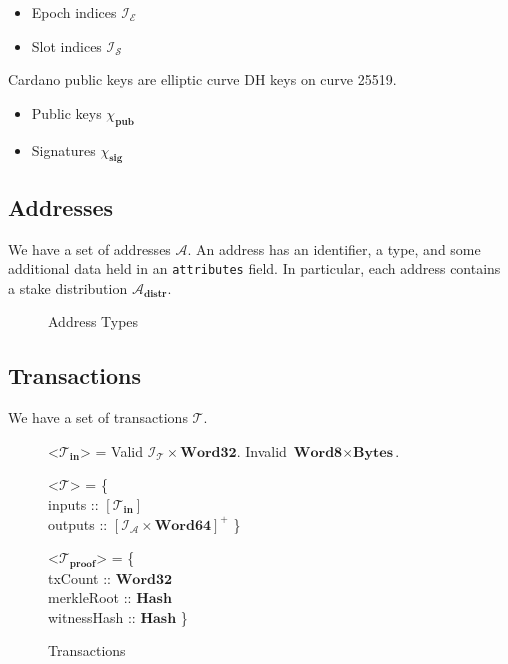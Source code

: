 \documentclass{article}
\def\fld{\\\llap{,\quad}}%
\newcommand{\rhu}{\rightharpoonup}
\newcommand{\lists}[1]{\left[{#1}\right]}
\newcommand{\nelists}[1]{\left[{#1}\right]^+}
\newcommand{\maybe}[1]{$()$ | {#1}}
\newcommand{\idsof}[1]{\mathcal{I}\!_#1}
\newcommand{\txids}{\idsof{\txs}}
\newcommand{\agentids}{\idsof{\agents}}
\newcommand{\epochids}{\idsof{\mathcal{E}}}
\newcommand{\slotids}{\idsof{\mathcal{S}}}
\newcommand{\pubkey}{\chi_{\textbf{pub}}}
\newcommand{\signature}{\chi_{\textbf{sig}}}
\newcommand{\agents}{\mathcal{A}}
\newcommand{\txs}{\mathcal{T}}
\newcommand{\txins}{\txs_{\textbf{in}}}
\newcommand{\txpf}{\txs_{\textbf{proof}}}
\newcommand{\hstype}[1]{\textbf{#1}}
\newcommand{\Word}[1]{\hstype{Word#1}}
\newcommand{\hash}{\hstype{Hash}}
\newcommand{\Bytes}{\hstype{Bytes}}
\begin{document}
\begin{itemize}
\item Epoch indices $\epochids$
\item Slot indices $\slotids$
\end{itemize}

Cardano public keys are elliptic curve DH keys on curve 25519.

\begin{itemize}
\item Public keys $\pubkey$
\item Signatures $\signature$
\end{itemize}

\subsection{Addresses}

We have a set of addresses $\agents$. An address has an identifier, a type, and
some additional data held in an \verb|attributes| field. In particular, each
address contains a stake distribution $\agents_{\textbf{distr}}$.

\begin{figure}[H]

  \caption{Address Types}
\end{figure}

\subsection{Transactions}

We have a set of transactions $\txs$.

\begin{figure}[H]
  \caption{Transactions}
  \label{fig:txin}
  \begin{grammar}
    <$\txins$> = Valid $\txids\times\Word{32}$.
    \alt Invalid $\Word{8}\times\Bytes$.

    <$\txs$> = \{
    \fld inputs :: $\lists{\txins}$
    \fld outputs :: $\nelists{\agentids \times \Word{64}}$
    \}

    <$\txpf$> = \{
    \fld txCount :: $\Word{32}$
    \fld merkleRoot :: $\hash$
    \fld witnessHash :: $\hash$
    \}
  \end{grammar}
\end{figure}
\end{document}
